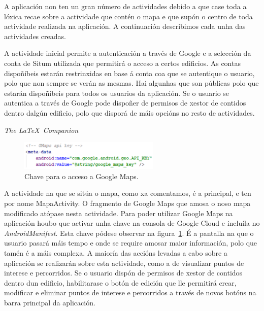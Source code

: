 A aplicación non ten un gran número de actividades debido a que case toda a lóxica recae sobre a actividade que contén o mapa e que supón o centro de toda actividade realizada na aplicación. A continuación describimos cada unha das actividades creadas.


A actividade inicial permite a autenticación a través de Google e a selección da conta de Situm utilizada que permitirá o acceso a certos edificios. As contas dispoñíbeis estarán restrinxidas en base á conta coa que se autentique o usuario, polo que non sempre se verán as mesmas. Hai algunhas que son públicas polo que estarán dispoñíbeis para todos os usuarios da aplicación. Se o usuario se autentica a través de Google pode dispoñer de permisos de xestor de contidos dentro dalgún edificio, polo que disporá de máis opcións no resto de actividades.

\textit{The \LaTeX\ Companion}
\cite{latexcompanion}


\begin{figure}[h]
	\begin{center}
		\includegraphics[width=0.6\textwidth]{figures/codigo/chaveGoogleMaps}
		\caption{Chave para o acceso a Google Maps.}
		\label{fig:chaveGoogleMaps}
	\end{center}
\end{figure}

A actividade na que se sitúa o mapa, como xa comentamos, é a principal, e ten por nome MapaActivity. O fragmento de Google Maps que amosa o noso mapa modificado atópase nesta actividade. Para poder utilizar Google Maps na aplicación houbo que activar unha chave na consola de Google Cloud e incluíla no \emph{AndroidManifest}. Esta chave pódese observar na figura~\ref{fig:chaveGoogleMaps}. É a pantalla na que o usuario pasará máis tempo e onde se require amosar maior información, polo que tamén é a máis complexa. A maioría das accións levadas a cabo sobre a aplicación se realizarán sobre esta actividade, como a de visualizar puntos de interese e percorridos. Se o usuario dispón de permisos de xestor de contidos dentro dun edificio, habilitarase o botón de edición que lle permitirá crear, modificar e eliminar puntos de interese e percorridos a través de novos botóns na barra principal da aplicación.

